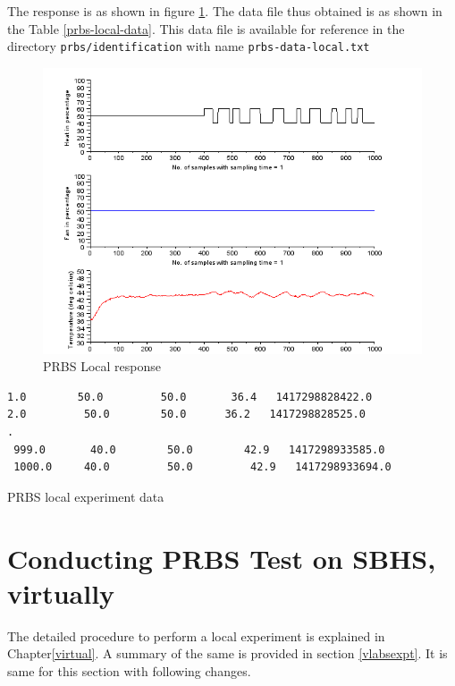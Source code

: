 The response is as shown in figure \ref{prbs-test-local}. The data file thus obtained is as shown in the Table \ref{prbs-local-data}. This data file is available for reference in the directory {\tt prbs/identification} with name {\tt prbs-data-local.txt}


\begin{figure}
\centering
\includegraphics[width=0.7\linewidth]{prbs/prbs-local.png}
\caption{PRBS Local response}
\label{prbs-test-local}
\end{figure}

\begin{table}
\begin{verbatim}
1.0        50.0         50.0       36.4   1417298828422.0
2.0         50.0        50.0      36.2   1417298828525.0
.
 999.0       40.0        50.0        42.9   1417298933585.0
 1000.0     40.0         50.0         42.9   1417298933694.0
\end{verbatim}
\caption{PRBS local experiment data}
\label{prbs-local-data}
\end{table}

\section{Conducting PRBS Test on SBHS, virtually}
The detailed procedure to perform a local experiment is explained in Chapter\ref{virtual}. A summary of the same is provided in section \ref{vlabsexpt}. It is same for this section with following changes.

